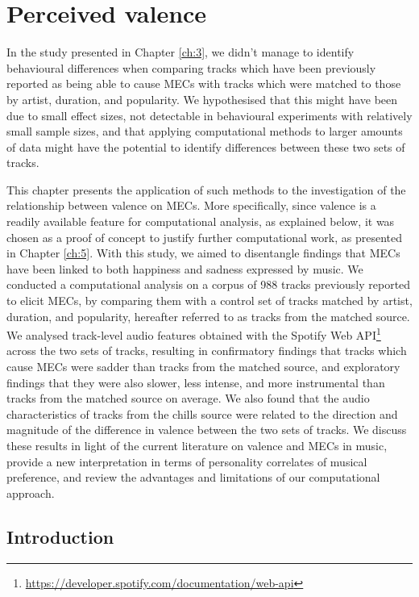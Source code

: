 
\chapter{Perceived valence}
\label{ch:4}

In the study presented in Chapter \ref{ch:3}, we didn't manage to identify behavioural differences when comparing tracks which have been previously reported as being able to cause MECs with tracks which were matched to those by artist, duration, and popularity. We hypothesised that this might have been due to small effect sizes, not detectable in behavioural experiments with relatively small sample sizes, and that applying computational methods to larger amounts of data might have the potential to identify differences between these two sets of tracks. 

This chapter presents the application of such methods to the investigation of the relationship between valence on MECs. More specifically, since valence is a readily available feature for computational analysis, as explained below, it was chosen as a proof of concept to justify further computational work, as presented in Chapter \ref{ch:5}. With this study, we aimed to disentangle findings that MECs have been linked to both happiness and sadness expressed by music. We conducted a computational analysis on a corpus of 988 tracks previously reported to elicit MECs, by comparing them with a control set of tracks matched by artist, duration, and popularity, hereafter referred to as tracks from the matched source. We analysed track-level audio features obtained with the Spotify Web API\footnote{\url{https://developer.spotify.com/documentation/web-api}} across the two sets of tracks, resulting in confirmatory findings that tracks which cause MECs were sadder than tracks from the matched source, and exploratory findings that they were also slower, less intense, and more instrumental than tracks from the matched source on average. We also found that the audio characteristics of tracks from the chills source were related to the direction and magnitude of the difference in valence between the two sets of tracks. We discuss these results in light of the current literature on valence and MECs in music, provide a new interpretation in terms of personality correlates of musical preference, and review the advantages and limitations of our computational approach.

\section{Introduction}
\label{se:val-intro}

